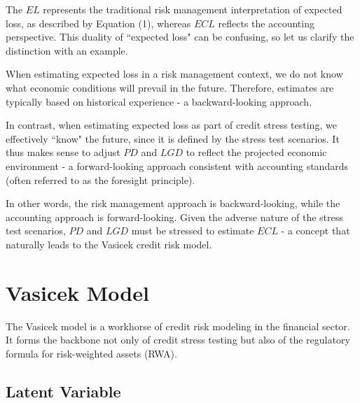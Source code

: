 \documentclass[11pt,a4paper]{article}
\begin{document}
The $EL$ represents the traditional risk management interpretation of expected loss, as described by Equation (1), whereas $ECL$ reflects the accounting perspective. This duality of ``expected loss" can be confusing, so let us clarify the distinction with an example.

When estimating expected loss in a risk management context, we do not know what economic conditions will prevail in the future. Therefore, estimates are typically based on historical experience - a backward-looking approach.

In contrast, when estimating expected loss as part of credit stress testing, we effectively ``know" the future, since it is defined by the stress test scenarios. It thus makes sense to adjust $PD$ and $LGD$ to reflect the projected economic environment - a forward-looking approach consistent with accounting standards (often referred to as the foresight principle).

In other words, the risk management approach is backward-looking, while the accounting approach is forward-looking. Given the adverse nature of the stress test scenarios, $PD$ and $LGD$ must be stressed to estimate $ECL$ - a concept that naturally leads to the Vasicek credit risk model.

\section{Vasicek Model}

The Vasicek model is a workhorse of credit risk modeling in the financial sector. It forms the backbone not only of credit stress testing but also of the regulatory formula for risk-weighted assets (RWA).

\subsection{Latent Variable}
\end{document}
